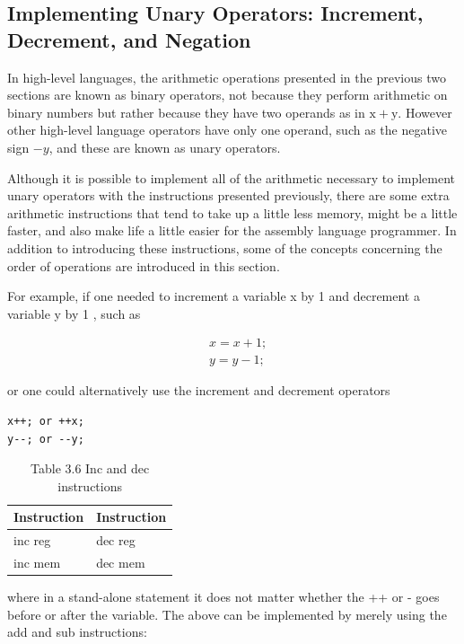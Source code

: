 \documentclass[10pt]{article}
\begin{document}
\subsection*{Implementing Unary Operators: Increment, Decrement, and Negation}
In high-level languages, the arithmetic operations presented in the previous two sections are known as binary operators, not because they perform arithmetic on binary numbers but rather because they have two operands as in $\mathrm{x}+\mathrm{y}$. However other high-level language operators have only one operand, such as the negative sign $-y$, and these are known as unary operators.

Although it is possible to implement all of the arithmetic necessary to implement unary operators with the instructions presented previously, there are some extra arithmetic instructions that tend to take up a little less memory, might be a little faster, and also make life a little easier for the assembly language programmer. In addition to introducing these instructions, some of the concepts concerning the order of operations are introduced in this section.

For example, if one needed to increment a variable x by 1 and decrement a variable y by 1 , such as

$$
\begin{aligned}
& x=x+1 ; \\
& y=y-1 ;
\end{aligned}
$$

or one could alternatively use the increment and decrement operators

\begin{verbatim}
x++; or ++x;
y--; or --y;
\end{verbatim}

\begin{table}[h]
\begin{center}
\captionsetup{labelformat=empty}
\caption{Table 3.6 Inc and dec instructions}
\begin{tabular}{|l|l|}
\hline
Instruction & Instruction \\
\hline
inc reg & dec reg \\
\hline
inc mem & dec mem \\
\hline
\end{tabular}
\end{center}
\end{table}

where in a stand-alone statement it does not matter whether the ++ or - goes before or after the variable. The above can be implemented by merely using the add and sub instructions:
\end{document}
